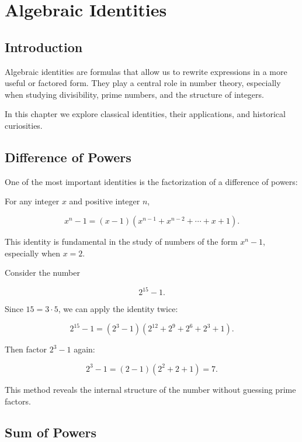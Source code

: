 \section{Algebraic Identities}

\subsection{Introduction}

Algebraic identities are formulas that allow us to rewrite expressions in a
more useful or factored form. They play a central role in number theory,
especially when studying divisibility, prime numbers, and the structure of
integers.

In this chapter we explore classical identities, their applications, and
historical curiosities.

\subsection{Difference of Powers}

One of the most important identities is the factorization of a difference of
powers:

\begin{theorem}
For any integer \(x\) and positive integer \(n\),


\[
x^n - 1 = (x - 1)(x^{n-1} + x^{n-2} + \cdots + x + 1).
\]


\end{theorem}

This identity is fundamental in the study of numbers of the form
\(x^n - 1\), especially when \(x = 2\).

\begin{example}
Consider the number


\[
2^{15} - 1.
\]


Since \(15 = 3 \cdot 5\), we can apply the identity twice:


\[
2^{15} - 1 = (2^3 - 1)(2^{12} + 2^9 + 2^6 + 2^3 + 1).
\]


Then factor \(2^3 - 1\) again:


\[
2^3 - 1 = (2 - 1)(2^2 + 2 + 1) = 7.
\]


This method reveals the internal structure of the number without guessing
prime factors.
\end{example}

\subsection{Sum of Powers}

